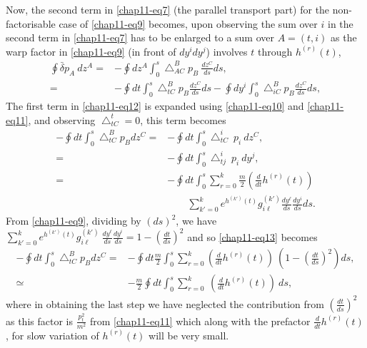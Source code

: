 Now, the second term in \eqref{chap11-eq7} (the parallel transport part) for the non-factorisable case of \eqref{chap11-eq9} becomes, upon  observing the sum over $i$ in the second term in \eqref{chap11-eq7} has to be enlarged to a sum over $A=(t,i)$ as the warp  factor in \eqref{chap11-eq9} (in front of $dy^idy^j$) involves $t$ through $h^{(r)}(t)$,  
\begin{align}
\oint {\bar{\delta}}p_A\ dz^A= &-\oint dz^A\int_0^s{\bigtriangleup}^B_{AC}p_B\ \frac{dz^C}{ds} ds, \nonumber \\
= &-\oint dt\int_0^s{\bigtriangleup}^B_{tC}p_B\frac{dz^C}{ds}ds-\oint dy^i\int_0^s{\bigtriangleup}^B_{iC}p_B
\frac{dz^C}{ds}ds,\label{chap11-eq12}
\end{align}
The first term in \eqref{chap11-eq12} is expanded using \eqref{chap11-eq10} and \eqref{chap11-eq11}, and observing ${\bigtriangleup}^t_{tC}=0$, this term becomes 
\begin{align}
-\oint dt\int_0^s{\bigtriangleup}^B_{tC}p_B dz^C= &-\oint dt\int_0^s {\bigtriangleup}^i_{tC}\ p_i\ dz^C, \nonumber \\
= &-\oint dt\int_0^s {\bigtriangleup}^i_{tj}\ p_i\ dy^j, \nonumber \\
= &-\oint dt\int_0^s\sum_{r=0}^k\frac{m}{2}\left(\frac{d}{dt}h^{(r)}(t)\right) \nonumber \\
& \qquad \sum_{k'=0}^ke^{h^{(k')}(t)}g_{i\ell}^{(k')} \frac{dy^{\ell}}{ds}\frac{dy^i}{ds}ds. \label{chap11-eq13}
\end{align}
From \eqref{chap11-eq9}, dividing by $(ds)^2$, we have $ {\sum}_{k'=0}^ke^{h^{(k')}(t)}g_{i\ell}^{(k')}\ 
\frac{dy^{\ell}}{ds}\frac{dy^i}{ds}=1-\left(\frac{dt}{ds}\right)^2$ and so \eqref{chap11-eq13} becomes 
\begin{align}
-\oint dt\int_0^s{\bigtriangleup}^B_{tC}p_Bdz^C= &-\oint dt\frac{m}{2}\int_0^s \sum_{r=0}^k \left(\frac{d}{dt}
h^{(r)}(t)\right)\ \left(1-\left(\frac{dt}{ds}\right)^2\right) ds, \nonumber \\
\simeq & -\frac{m}{2}\oint dt \int_0^s\sum_{r=0}^k\ \left(\frac{d}{dt}h^{(r)}(t)\right)\ ds,\label{chap11-eq14}
\end{align}
where in obtaining the last step we have neglected the contribution from $\left(\frac{dt}{ds}\right)^2$ as this 
factor is $\frac{p_t^2}{m^2}$ from \eqref{chap11-eq11} which along with the prefactor $\frac{d}{dt}h^{(r)}(t)$, for slow 
variation of $h^{(r)}(t)$ will be very small. 

